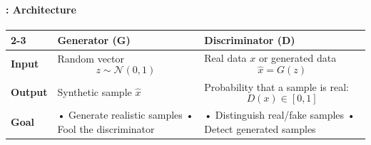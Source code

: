 \documentclass[xcolor=table]{beamer}
\begin{document}
	
	\begin{frame}
		\frametitle{\insertshortsubtitle}
		\framesubtitle{\insertsection: Architecture}
		
		
		\vspace{0.2cm}
		
		\scriptsize
		
		\begin{tabular}{p{}p{}p{}}
			\cline{2-3}
			
			& \centering\textbf{Generator (G)} 
			& \centering\arraybackslash\textbf{Discriminator (D)} \\
			
			\hline\hline
			
			\textbf{Input}
			&
			Random vector
			\[
			z \sim \mathcal{N}(0,1)
			\]
			&
			Real data \(x\) or generated data
			\[
			\hat{x} = G(z)
			\]
			\\
			
			\hline
			
			\textbf{Output}
			&
			Synthetic sample \(\hat{x}\)
			&
			Probability that a sample is real:
			\[
			D(x)\in[0,1]
			\]
			\\
			
			\hline
			
			\textbf{Goal}
			&
			• Generate realistic samples \newline
			• Fool the discriminator
			&
			• Distinguish real/fake samples \newline
			• Detect generated samples
			\\
			
			\hline\hline
			
		\end{tabular}
		
	\end{frame}
	
\end{document}

